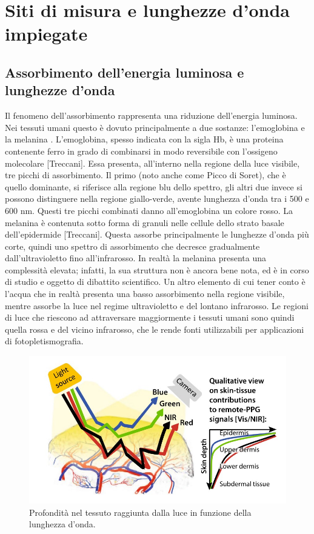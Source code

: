 \section{Siti di misura e lunghezze d'onda impiegate}
\subsection{Assorbimento dell'energia luminosa e lunghezze d'onda}
Il fenomeno dell'assorbimento rappresenta una riduzione dell'energia luminosa. Nei tessuti umani questo è dovuto principalmente a due sostanze: l'emoglobina e la melanina \cite{Lister2012}.
L'emoglobina, spesso indicata con la sigla Hb, è una proteina contenente ferro in grado di combinarsi in modo reversibile con l’ossigeno molecolare [Treccani]. Essa presenta, all'interno nella regione della luce visibile, tre picchi di assorbimento. Il primo (noto anche come Picco di Soret), che è quello dominante, si riferisce alla regione blu dello spettro, gli altri due invece si possono distinguere nella regione giallo-verde, avente lunghezza d'onda tra i 500 e 600 nm. Questi tre picchi combinati danno all'emoglobina un colore rosso.
La melanina è contenuta sotto forma di granuli nelle cellule dello strato basale dell’epidermide [Treccani]. Questa assorbe principalmente le lunghezze d'onda più corte, quindi uno spettro di assorbimento che decresce gradualmente dall'ultravioletto fino all'infrarosso. In realtà la melanina presenta una complessità elevata; infatti, la sua struttura non è ancora bene nota, ed è in corso di studio e oggetto di dibattito scientifico.
Un altro elemento di cui tener conto è l'acqua che in realtà presenta una basso assorbimento nella regione visibile, mentre assorbe la luce nel regime ultravioletto e del lontano infrarosso. Le regioni di luce che riescono ad attraversare maggiormente i tessuti umani sono quindi quella rossa e del vicino infrarosso, che le rende fonti utilizzabili per applicazioni di fotopletismografia.
\begin{figure}[h]
	\centering
	\includegraphics[width=0.7\linewidth]{ImageFiles/Fotopletismografia/PenetrazioneLuce}
	\caption{Profondità nel tessuto raggiunta dalla luce in funzione della lunghezza d'onda.}
	\label{fig:PenetrazioneLuce}
\end{figure}
